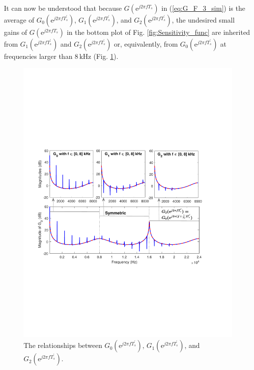 \documentclass [11pt, proquest] {uwthesis}[2020/02/24]
\begin{document}
It can now be understood that because $G(\text{e}^{j2\pi fT_{s}})$
in (\ref{eq:G_F_3_sim}) is the average of $G_{0}(\text{e}^{j2\pi fT_{s}^{'}})$,
$G_{1}(\text{e}^{j2\pi fT_{s}^{'}})$, and $G_{2}(\text{e}^{j2\pi fT_{s}^{'}})$,
the undesired small gains of $G(\text{e}^{j2\pi fT_{s}})$ in the
bottom plot of Fig. \ref{fig:Sensitivity_func} are inherited from
$G_{1}(\text{e}^{j2\pi fT_{s}^{'}})$ and $G_{2}(\text{e}^{j2\pi fT_{s}^{'}})$
or, equivalently, from $G_{0}(\text{e}^{j2\pi fT_{s}^{'}})$ at frequencies
larger than $8\,\text{kHz}$ (Fig. \ref{fig:The-relationship-between}).
\begin{figure}[!ht]
\begin{centering}
\includegraphics[width=13cm]{Fractional-order-RC/G_all}
\par\end{centering}
\caption{\label{fig:The-relationship-between}The relationships between $G_{0}(\text{e}^{j2\pi fT_{s}^{'}})$,
$G_{1}(\text{e}^{j2\pi fT_{s}^{'}})$, and $G_{2}(\text{e}^{j2\pi fT_{s}^{'}})$.}
\end{figure}
 
\end{document}
